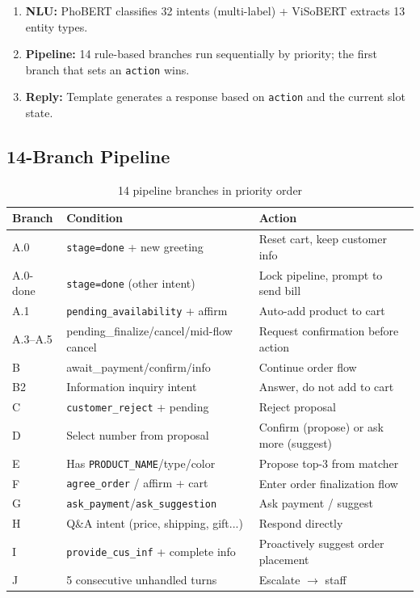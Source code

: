 \documentclass[12pt, a4paper]{report}
\begin{document}
\begin{enumerate}
  \item \textbf{NLU:} PhoBERT classifies 32 intents (multi-label) +
        ViSoBERT extracts 13 entity types.
  \item \textbf{Pipeline:} 14 rule-based branches run sequentially by priority;
        the first branch that sets an \texttt{action} wins.
  \item \textbf{Reply:} Template generates a response based on \texttt{action}
        and the current slot state.
\end{enumerate}

\subsection{14-Branch Pipeline}

\begin{table}[H]
\centering
\caption{14 pipeline branches in priority order}
\label{tab:pipeline}
\begin{tabularx}{\linewidth}{llX}
\toprule
\textbf{Branch} & \textbf{Condition} & \textbf{Action} \\
\midrule
A.0      & \texttt{stage=done} + new greeting      & Reset cart, keep customer info \\
A.0-done & \texttt{stage=done} (other intent)       & Lock pipeline, prompt to send bill \\
A.1      & \texttt{pending\_availability} + affirm  & Auto-add product to cart \\
A.3--A.5 & pending\_finalize/cancel/mid-flow cancel & Request confirmation before action \\
B        & await\_payment/confirm/info              & Continue order flow \\
B2       & Information inquiry intent               & Answer, do not add to cart \\
C        & \texttt{customer\_reject} + pending      & Reject proposal \\
D        & Select number from proposal              & Confirm (propose) or ask more (suggest) \\
E        & Has \texttt{PRODUCT\_NAME}/type/color    & Propose top-3 from matcher \\
F        & \texttt{agree\_order} / affirm + cart    & Enter order finalization flow \\
G        & \texttt{ask\_payment}/\texttt{ask\_suggestion} & Ask payment / suggest \\
H        & Q\&A intent (price, shipping, gift...)   & Respond directly \\
I        & \texttt{provide\_cus\_inf} + complete info & Proactively suggest order placement \\
J        & 5 consecutive unhandled turns            & Escalate $\rightarrow$ staff \\
\bottomrule
\end{tabularx}
\end{table}
\end{document}
